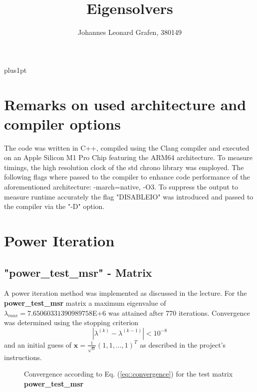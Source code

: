 \documentclass[11pt,a4paper]{article}
\title{Eigensolvers}
\author{Johannes Leonard Grafen, 380149}
\newcommand{\refEq}[1]{Eq. (\ref{#1})}
\begin{document}
\renewcommand\baselinestretch{1.0}
\baselineskip=18pt plus1pt	

\maketitle
\newpage
{}
\tableofcontents
\listoffigures	%
\listoftables  %
\newpage

\section{Remarks on used architecture and compiler options}
The code was written in C++, compiled using the Clang compiler and executed on an Apple Silicon M1 Pro Chip featuring the ARM64 architecture. To measure timings, the high resolution clock of the std chrono library was employed. The following flags where passed to the compiler to enhance code performance of the aforementioned architecture: -march=native, -O3. To suppress the output to measure runtime accurately the flag "DISABLEIO" was introduced and passed to the compiler via the "-D" option.

\section{Power Iteration}
\subsection{"{power\_test\_msr}" - Matrix}
A power iteration method was implemented as discussed in the lecture. For the \textbf{power\_test\_msr} matrix a maximum eigenvalue of $\lambda_{max} = 7.65060331390989758$E+6 was attained after 770 iterations. Convergence was determined using the stopping criterion 
%
\begin{equation}
	|\lambda^{(k)} - \lambda^{(k-1)}| < 10^{-8}
	\label{eq::convergence}
\end{equation}
%
and an initial guess of $\mathbf{x} = \frac{1}{\sqrt{n}} (1,1, ..., 1)^T$ as described in the project's instructions. 
%
\begin{figure}[!htbp]
	\centering
	\hspace*{0.8cm}
	\leavevmode
	\resizebox{0.9\width}{!}{}
	\caption{Convergence according to \refEq{eq::convergence} for the test matrix \textbf{power\_test\_msr}}
	\label{fig::convTest}
\end{figure}
\end{document}
